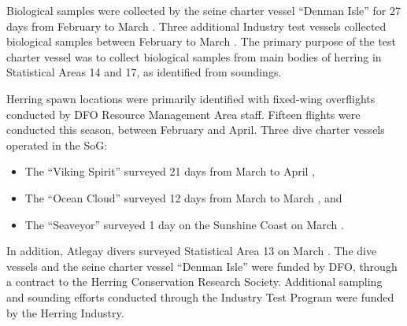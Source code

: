 Biological samples were collected by the seine charter vessel ``Denman Isle'' for 27 days from February  to March .
Three additional Industry test vessels collected biological samples between February  to March .
The primary purpose of the test charter vessel was to collect biological samples from main bodies of herring in Statistical Areas 14 and 17, as identified from soundings.

Herring spawn locations were primarily identified with fixed-wing overflights conducted by DFO Resource Management Area staff.
Fifteen flights were conducted this season, between February and April.
Three dive charter vessels operated in the SoG:
\begin{itemize}
\item The ``Viking Spirit'' surveyed 21 days from March  to April , 
\item The ``Ocean Cloud'' surveyed 12 days from March  to March , and
\item The ``Seaveyor'' surveyed 1 day on the Sunshine Coast on March .
\end{itemize}
In addition, Atlegay divers surveyed Statistical Area 13 on March .
The dive vessels and the seine charter vessel ``Denman Isle'' were funded by DFO, through a contract to the Herring Conservation Research Society.
Additional sampling and sounding efforts conducted through the Industry Test Program were funded by the Herring Industry.